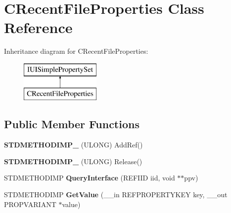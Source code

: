 \hypertarget{class_c_recent_file_properties}{\section{C\-Recent\-File\-Properties Class Reference}
\label{class_c_recent_file_properties}
}
Inheritance diagram for C\-Recent\-File\-Properties\-:\begin{figure}[H]
\begin{center}
\leavevmode
\includegraphics[height=2.000000cm]{class_c_recent_file_properties}
\end{center}
\end{figure}
\subsection*{Public Member Functions}
\begin{DoxyCompactItemize}
\item 
\hypertarget{class_c_recent_file_properties_a43759c5b80143c716b84e94b8c8ba506}{{\bfseries S\-T\-D\-M\-E\-T\-H\-O\-D\-I\-M\-P\-\_\-} (U\-L\-O\-N\-G) Add\-Ref()}\label{class_c_recent_file_properties_a43759c5b80143c716b84e94b8c8ba506}

\item 
\hypertarget{class_c_recent_file_properties_a7481206788cc45f96c09de409a0742a4}{{\bfseries S\-T\-D\-M\-E\-T\-H\-O\-D\-I\-M\-P\-\_\-} (U\-L\-O\-N\-G) Release()}\label{class_c_recent_file_properties_a7481206788cc45f96c09de409a0742a4}

\item 
\hypertarget{class_c_recent_file_properties_ae09c6b29c74e88f7e47eae3d74ebb84e}{S\-T\-D\-M\-E\-T\-H\-O\-D\-I\-M\-P {\bfseries Query\-Interface} (R\-E\-F\-I\-I\-D iid, void $\ast$$\ast$ppv)}\label{class_c_recent_file_properties_ae09c6b29c74e88f7e47eae3d74ebb84e}

\item 
\hypertarget{class_c_recent_file_properties_acfc60a7dbcd2813506045bd356903255}{S\-T\-D\-M\-E\-T\-H\-O\-D\-I\-M\-P {\bfseries Get\-Value} (\-\_\-\-\_\-in R\-E\-F\-P\-R\-O\-P\-E\-R\-T\-Y\-K\-E\-Y key, \-\_\-\-\_\-out P\-R\-O\-P\-V\-A\-R\-I\-A\-N\-T $\ast$value)}\label{class_c_recent_file_properties_acfc60a7dbcd2813506045bd356903255}

\end{DoxyCompactItemize}

